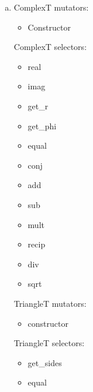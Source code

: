 \documentclass[12pt]{article}
\begin{document}
\begin{enumerate}[(a)]

\item ComplexT mutators: 

\begin{itemize}

\item Constructor    

\end{itemize}

\noindent ComplexT selectors:

\begin{itemize}
    
\item real

\item imag

\item get\_r

\item get\_phi

\item equal

\item conj

\item add

\item sub

\item mult

\item recip

\item div

\item sqrt

\end{itemize}

\noindent TriangleT mutators:

\begin{itemize}
    
\item constructor

\end{itemize}

\noindent TriangleT selectors:

\begin{itemize}
    
\item get\_sides

\item equal


\end{itemize}
\end{enumerate}
\end{document}
